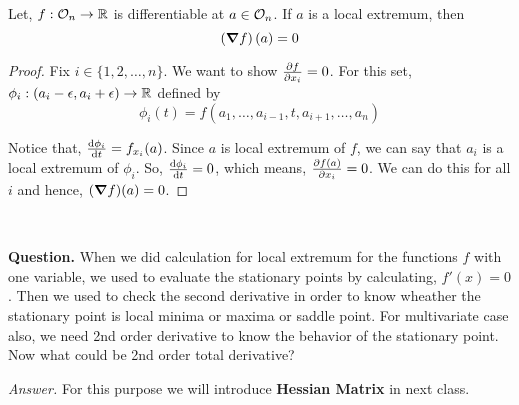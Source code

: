 \documentclass[../Analysis-3.tex]{subfiles}
\begin{document}
\begin{Thm}{}{}
    Let, $f: \mathcal{O}_{n} \to \mathbb{R}$ is differentiable at $a \in \mathcal{O}_{n}$. If $a$ is a local extremum, then \[ \left(\grad f\right)(a) = 0 \]
\end{Thm}

\begin{proof}
    Fix $i \in \{1,2, \ldots, n\}$. We want to show $\pdv{f}{x_i} = 0$. For this set, $\phi_i : (a_i - \epsilon, a_i + \epsilon) \to \mathbb{R}$ defined by $$ \phi_i(t) = f(a_1, \ldots, a_{i-1}, t, a_{i+1}, \ldots, a_n)$$

    Notice that, $\dv{\phi_i}{t}(a_i) = f_{x_i}(a)$. Since $a$ is local extremum of $f$, we can say that $a_i$ is a local extremum of $\phi_i$. So, $\dv{\phi_i}{t}(a_i) = 0$, which means, $\pdv{f(a)}{x_i} = 0$. We can do this for all $i$ and hence, $(\grad f)(a) = 0$.
\end{proof}

\

\textbf{Question.} When we did calculation for local extremum for the functions $f$ with one variable, we used to evaluate the stationary points by calculating, $f'(x) =0$. Then we used to check the second derivative in order to know wheather the stationary point is local minima or maxima or saddle point. For multivariate case also, we need 2nd order derivative to know the behavior of the stationary point. Now what could be 2nd order total derivative?

\ssk

\textit{Answer.} For this purpose we will introduce \textbf{Hessian Matrix} in next class.
\end{document}
